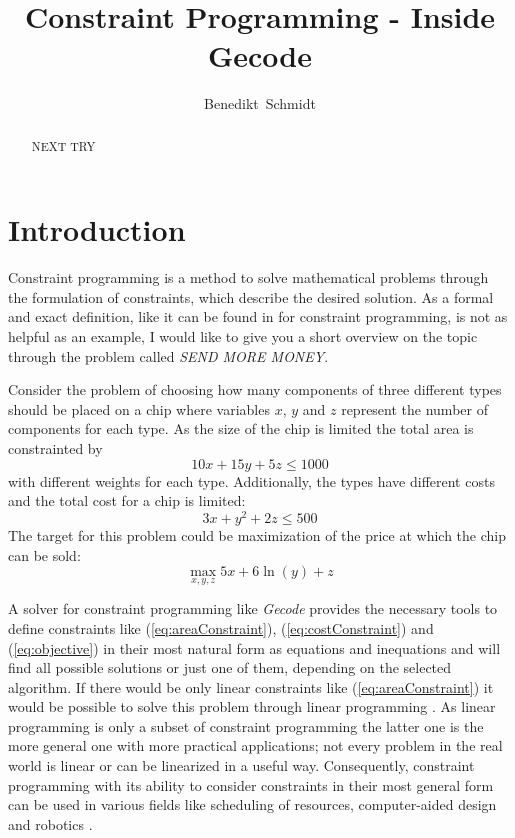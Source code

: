 \documentclass[10pt,
               a4paper,
               journal,
               ]{IEEEtran}
\makeatletter
\def\markboth#1#2{\def\leftmark{\@IEEEcompsoconly{\sffamily}\MakeUppercase{\protect#1}}%
\def\rightmark{\@IEEEcompsoconly{\sffamily}\MakeUppercase{\protect#2}}}
\newcommand{\refeq}[1]{{(\ref{#1})}}
\makeatother
\begin{document}
	\title{Constraint Programming - Inside Gecode}
	\author{Benedikt~Schmidt}
	\markboth{Advanced Seminar for Security in Information Technology, Summer Term 2014}%
	{Benedikt Schmidt: Constraint Programming - Inside Gecode}	
	\maketitle	
	
	\begin{abstract}	
		NEXT TRY
	\end{abstract}
	
	\section{Introduction}
	Constraint programming is a method to solve mathematical problems through the formulation of constraints, which describe the desired solution. As a formal and exact definition, like it can be found in \cite[p.~16]{handbookCP} for constraint programming, is not as helpful as an example, I would like to give you a short overview on the topic through the problem called \emph{SEND MORE MONEY}.
	
	Consider the problem of choosing how many components of three different types should be placed on a chip where variables $x$, $y$ and $z$ represent the number of components for each type. As the size of the chip is limited the total area is constrainted by
	\begin{equation}
		10x + 15y + 5z \le 1000
		\label{eq:areaConstraint}
	\end{equation}
	with different weights for each type. Additionally, the types have different costs and the total cost for a chip is limited:
	\begin{equation}
		3x + y^2 + 2z \le 500
		\label{eq:costConstraint}
	\end{equation}
	The target for this problem could be maximization of the price at which the chip can be sold:
	\begin{equation}
		\max_{x, y, z} 5x + 6\ln(y) + z
		\label{eq:objective}
	\end{equation}
	
	A solver for constraint programming like \emph{Gecode} provides the necessary tools to define constraints like \refeq{eq:areaConstraint}, \refeq{eq:costConstraint} and \refeq{eq:objective} in their most natural form as equations and inequations and will find all possible solutions or just one of them, depending on the selected algorithm. If there would be only linear constraints like \refeq{eq:areaConstraint} it would be possible to solve this problem through linear programming \cite[1]{linearProgramming}. As linear programming is only a subset of constraint programming the latter one is the more general one with more practical applications; not every problem in the real world is linear or can be linearized in a useful way. Consequently, constraint programming with its ability to consider constraints in their most general form can be used in various fields like scheduling of resources, computer-aided design and robotics \cite[p.~221]{trendsInCP}.
	
\end{document}
